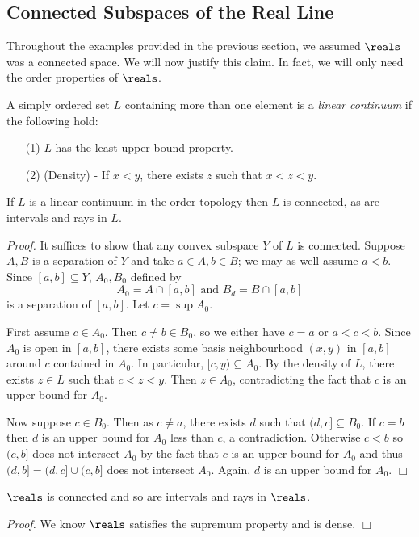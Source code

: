 \subsection{Connected Subspaces of the Real Line}
Throughout the examples provided in the previous section, we assumed $\reals$ was a connected space. We will now justify this claim. In fact, we will only need the order properties of $\reals$.
\begin{definition}\label{3.8}
    A simply ordered set $L$ containing more than one element is a {\it linear continuum} if the following hold:
    \begin{enumerate}
        \item[(1)] $L$ has the least upper bound property.
        \item[(2)] (Density) - If $x < y$, there exists $z$ such that $x < z < y$.
    \end{enumerate}
\end{definition}
\begin{theorem}\label{3.9}
    If $L$ is a linear continuum in the order topology then $L$ is connected, as are intervals and rays in $L$.
\end{theorem}
{\it Proof.} It suffices to show that any convex subspace $Y$ of $L$ is connected. Suppose $A, B$ is a separation of $Y$ and take $a \in A, b \in B$; we may as well assume $a < b$. Since $[a, b] \subseteq Y$, $A_0, B_0$ defined by
$$A_0 = A \cap [a, b] \text{ and } B_d = B \cap [a, b]$$
is a separation of $[a, b]$. Let $c = \sup A_0$.

First assume $c \in A_0$. Then $c \neq b \in B_0$, so we either have $c = a$ or $a < c < b$. Since $A_0$ is open in $[a, b]$, there exists some basis neighbourhood $(x, y)$ in $[a, b]$ around $c$ contained in $A_0$. In particular, $[c, y) \subseteq A_0$. By the density of $L$, there exists $z \in L$ such that $c < z < y$. Then $z \in A_0$, contradicting the fact that $c$ is an upper bound for $A_0$.

Now suppose $c \in B_0$. Then as $c \neq a$, there exists $d$ such that $(d, c] \subseteq B_0$. If $c = b$ then $d$ is an upper bound for $A_0$ less than $c$, a contradiction. Otherwise $c < b$ so $(c, b]$ does not intersect $A_0$ by the fact that $c$ is an upper bound for $A_0$ and thus $(d, b] = (d, c] \cup (c, b]$ does not intersect $A_0$. Again, $d$ is an upper bound for $A_0$. $\Box$

\begin{corollary}\label{3.10}
    $\reals$ is connected and so are intervals and rays in $\reals$.
\end{corollary}
{\it Proof.} We know $\reals$ satisfies the supremum property and is dense. $\Box$

